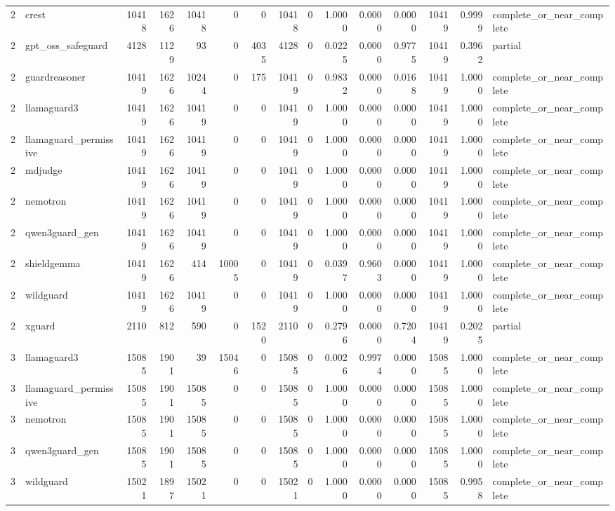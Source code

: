 \begin{tabular}{rlrrrrrrrrrrrrl}
2 & crest & 10418 & 1626 & 10418 & 0 & 0 & 10418 & 0 & 1.0000 & 0.0000 & 0.0000 & 10419 & 0.9999 & complete\_or\_near\_complete \\
2 & gpt\_oss\_safeguard & 4128 & 1129 & 93 & 0 & 4035 & 4128 & 0 & 0.0225 & 0.0000 & 0.9775 & 10419 & 0.3962 & partial \\
2 & guardreasoner & 10419 & 1626 & 10244 & 0 & 175 & 10419 & 0 & 0.9832 & 0.0000 & 0.0168 & 10419 & 1.0000 & complete\_or\_near\_complete \\
2 & llamaguard3 & 10419 & 1626 & 10419 & 0 & 0 & 10419 & 0 & 1.0000 & 0.0000 & 0.0000 & 10419 & 1.0000 & complete\_or\_near\_complete \\
2 & llamaguard\_permissive & 10419 & 1626 & 10419 & 0 & 0 & 10419 & 0 & 1.0000 & 0.0000 & 0.0000 & 10419 & 1.0000 & complete\_or\_near\_complete \\
2 & mdjudge & 10419 & 1626 & 10419 & 0 & 0 & 10419 & 0 & 1.0000 & 0.0000 & 0.0000 & 10419 & 1.0000 & complete\_or\_near\_complete \\
2 & nemotron & 10419 & 1626 & 10419 & 0 & 0 & 10419 & 0 & 1.0000 & 0.0000 & 0.0000 & 10419 & 1.0000 & complete\_or\_near\_complete \\
2 & qwen3guard\_gen & 10419 & 1626 & 10419 & 0 & 0 & 10419 & 0 & 1.0000 & 0.0000 & 0.0000 & 10419 & 1.0000 & complete\_or\_near\_complete \\
2 & shieldgemma & 10419 & 1626 & 414 & 10005 & 0 & 10419 & 0 & 0.0397 & 0.9603 & 0.0000 & 10419 & 1.0000 & complete\_or\_near\_complete \\
2 & wildguard & 10419 & 1626 & 10419 & 0 & 0 & 10419 & 0 & 1.0000 & 0.0000 & 0.0000 & 10419 & 1.0000 & complete\_or\_near\_complete \\
2 & xguard & 2110 & 812 & 590 & 0 & 1520 & 2110 & 0 & 0.2796 & 0.0000 & 0.7204 & 10419 & 0.2025 & partial \\
3 & llamaguard3 & 15085 & 1901 & 39 & 15046 & 0 & 15085 & 0 & 0.0026 & 0.9974 & 0.0000 & 15085 & 1.0000 & complete\_or\_near\_complete \\
3 & llamaguard\_permissive & 15085 & 1901 & 15085 & 0 & 0 & 15085 & 0 & 1.0000 & 0.0000 & 0.0000 & 15085 & 1.0000 & complete\_or\_near\_complete \\
3 & nemotron & 15085 & 1901 & 15085 & 0 & 0 & 15085 & 0 & 1.0000 & 0.0000 & 0.0000 & 15085 & 1.0000 & complete\_or\_near\_complete \\
3 & qwen3guard\_gen & 15085 & 1901 & 15085 & 0 & 0 & 15085 & 0 & 1.0000 & 0.0000 & 0.0000 & 15085 & 1.0000 & complete\_or\_near\_complete \\
3 & wildguard & 15021 & 1897 & 15021 & 0 & 0 & 15021 & 0 & 1.0000 & 0.0000 & 0.0000 & 15085 & 0.9958 & complete\_or\_near\_complete \\
\bottomrule
\end{tabular}
